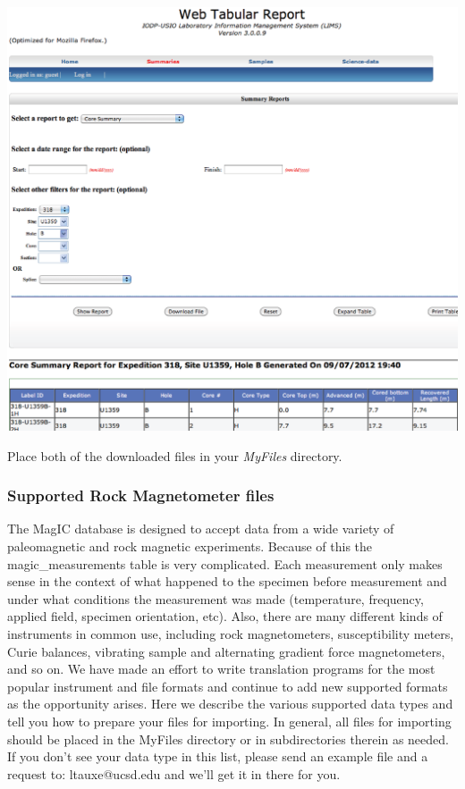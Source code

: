 \documentclass[11pt]{book}
\begin{document}
{\includegraphics[width=15cm]{EPSfiles/WebTabular_core.eps}

Place both of the downloaded files in your {\it MyFiles} directory.  


\subsubsection{Supported Rock Magnetometer files}

The MagIC database is designed to accept data from a wide variety of paleomagnetic and rock magnetic experiments. Because of this the magic\_measurements table is very complicated. Each measurement only makes sense in the context of what happened to the specimen before measurement and under what conditions the measurement was made (temperature, frequency, applied field, specimen orientation, etc). Also, there are many different kinds of instruments in common use, including rock magnetometers, susceptibility meters, Curie balances, vibrating sample and alternating gradient force magnetometers, and so on. We have made an effort to write translation programs for the most popular instrument and file formats and continue to add new supported formats as the opportunity arises. Here we describe the various supported data types and tell you how to prepare your files for importing. In general, all files for importing should be placed in the MyFiles directory or in subdirectories therein as needed.  If you don't see your data type in this list, please send an example file and a request to:  ltauxe@ucsd.edu and we'll get it in there for you.  


}
\end{document}

